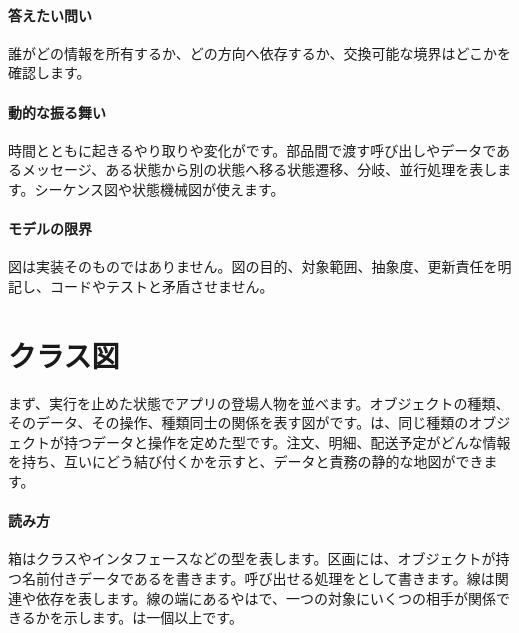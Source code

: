 \paragraph{答えたい問い}
        誰がどの情報を所有するか、どの方向へ依存するか、交換可能な境界はどこかを確認します。

\par
\endgroup
\medskip
\begingroup
\paragraph{動的な振る舞い}
        時間とともに起きるやり取りや変化がです。部品間で渡す呼び出しやデータであるメッセージ、ある状態から別の状態へ移る状態遷移、分岐、並行処理を表します。シーケンス図や状態機械図が使えます。

\paragraph{モデルの限界}
        図は実装そのものではありません。図の目的、対象範囲、抽象度、更新責任を明記し、コードやテストと矛盾させません。

\par
\endgroup
\par
\endgroup


\section{クラス図}
\label{sec:04-software-engineering-10}

まず、実行を止めた状態でアプリの登場人物を並べます。オブジェクトの種類、そのデータ、その操作、種類同士の関係を表す図がです。は、同じ種類のオブジェクトが持つデータと操作を定めた型です。注文、明細、配送予定がどんな情報を持ち、互いにどう結び付くかを示すと、データと責務の静的な地図ができます。

\begingroup
\begingroup
      \centering
\par
\endgroup
\medskip
\begingroup
\paragraph{読み方}
        箱はクラスやインタフェースなどの型を表します。区画には、オブジェクトが持つ名前付きデータであるを書きます。呼び出せる処理をとして書きます。線は関連や依存を表します。線の端にあるやはで、一つの対象にいくつの相手が関係できるかを示します。は一個以上です。

